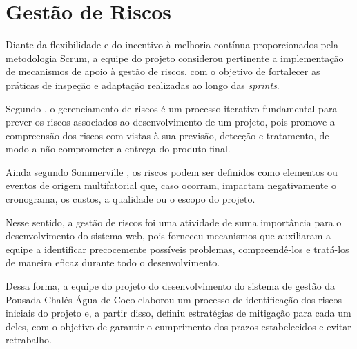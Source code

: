 \documentclass[
	12pt,				%
	openany,			%
	oneside,			%
	a4paper,			%
	english,			%
	french,				%
	spanish,			%
	brazil				%
	]{abntex2}
\begin{document}
\section{Gestão de Riscos}
Diante da flexibilidade e do incentivo à melhoria contínua proporcionados pela metodologia Scrum, a equipe do projeto considerou pertinente a implementação de mecanismos de apoio à gestão de riscos, com o objetivo de fortalecer as práticas de inspeção e adaptação realizadas ao longo das \textit{sprints}.

Segundo \cite[p. 416]{sommerville2011}, o gerenciamento de riscos é um processo iterativo fundamental para prever os riscos associados ao desenvolvimento de um projeto, pois promove a compreensão dos riscos com vistas à sua previsão, detecção e tratamento, de modo a não comprometer a entrega do produto final.

Ainda segundo Sommerville \cite[p. 416]{sommerville2011},  os riscos podem ser definidos como elementos ou eventos de origem multifatorial que, caso ocorram, impactam negativamente  o cronograma, os custos, a qualidade ou o escopo do projeto.

Nesse sentido, a gestão de riscos foi uma atividade de suma importância para o desenvolvimento do sistema web, pois forneceu mecanismos que auxiliaram a equipe a identificar precocemente possíveis problemas, compreendê-los e tratá-los de maneira eficaz durante todo o desenvolvimento. 

Dessa forma, a equipe do projeto do desenvolvimento do sistema de gestão da Pousada Chalés Água de Coco elaborou um processo de identificação dos riscos iniciais do projeto e, a partir disso, definiu estratégias de mitigação para cada um deles, com o objetivo de garantir o cumprimento dos prazos estabelecidos e evitar retrabalho.
\end{document}

